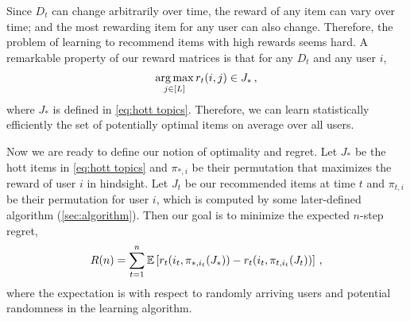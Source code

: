 Since $D_t$ can change arbitrarily over time, the reward of any item can vary over time; and the most rewarding item for any user can also change. Therefore, the problem of learning to recommend items with high rewards seems hard. A remarkable property of our reward matrices is that for any $D_t$ and any user $i$,
\begin{align*}
  \mathop{\rm arg\,max}_{j \in [L]} r_t(i, j) \in J_\ast\,,
\end{align*}
where $J_\ast$ is defined in \eqref{eq:hott topics}. Therefore, we can learn statistically efficiently the set of potentially optimal items on average over all users.

Now we are ready to define our notion of optimality and regret. Let $J_\ast$ be the hott items in \eqref{eq:hott topics} and $\pi_{\ast, i}$ be their permutation that maximizes the reward of user $i$ in hindsight. Let $J_t$ be our recommended items at time $t$ and $\pi_{t, i}$ be their permutation for user $i$, which is computed by some later-defined algorithm (\cref{sec:algorithm}). Then our goal is to minimize the expected $n$-step regret,
\begin{align*}
  R(n) =
  \sum_{t = 1}^n \mathbb{E}\left[r_t(i_t, \pi_{\ast, i_t}(J_\ast)) - r_t(i_t, \pi_{t, i_t}(J_t))\right]\,,
\end{align*}
where the expectation is with respect to randomly arriving users and potential randomness in the learning algorithm.
